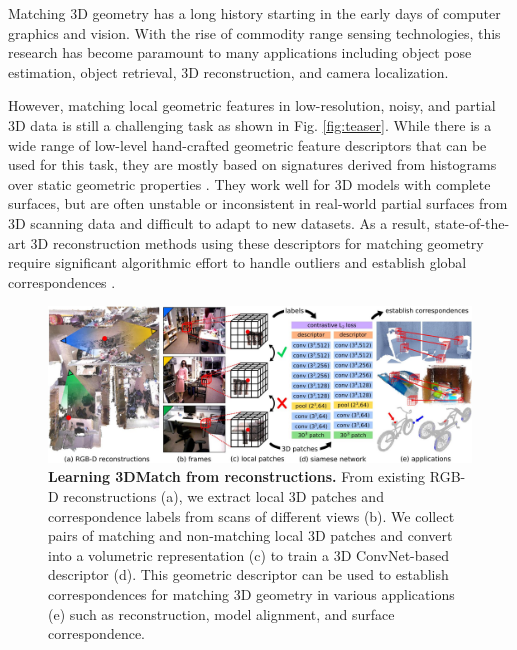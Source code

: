 \documentclass[10pt,twocolumn,letterpaper]{article}
\begin{document}
Matching 3D geometry has a long history starting in the early days of computer graphics and vision. With the rise of commodity range sensing technologies, this research has become paramount to many applications including object pose estimation, object retrieval, 3D reconstruction, and camera localization. 

However, matching local geometric features in low-resolution, noisy, and partial 3D data is still a challenging task as shown in Fig. \ref{fig:teaser}. While there is a wide range of low-level hand-crafted geometric feature descriptors that can be used for this task, they are mostly based on signatures derived from histograms over static geometric properties \cite{johnson1999using,lazebnik2004semi,rusu2009fast}. They work well for 3D models with complete surfaces, but are often unstable or inconsistent in real-world partial surfaces from 3D scanning data and difficult to adapt to new datasets.
As a result, state-of-the-art 3D reconstruction methods using these descriptors for matching geometry require significant algorithmic effort to handle outliers and establish global correspondences \cite{choi2015robust}.



\begin{figure}
\vspace{-5mm}
\includegraphics[width=1\linewidth]{images/overview.jpg}
\caption{{\bf Learning 3DMatch from reconstructions.} From existing RGB-D reconstructions (a), we extract local 3D patches and correspondence labels from scans of different views (b). We collect pairs of matching and non-matching local 3D patches and convert into a volumetric representation (c) to train a 3D ConvNet-based descriptor (d). This geometric descriptor can be used to establish correspondences for matching 3D geometry in various applications (e) such as reconstruction, model alignment, and surface correspondence.
}
\label{fig:overview}
\vspace{-2mm}
\end{figure}
\end{document}
